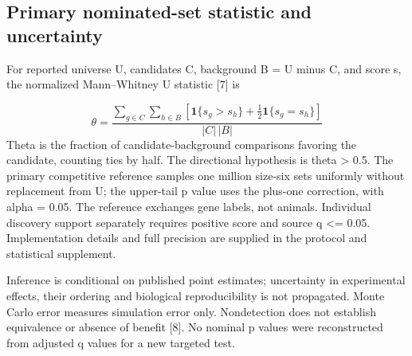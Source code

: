 \documentclass[11pt,letterpaper]{article}
\begin{document}
\subsection*{Primary nominated-set statistic and uncertainty}
For reported universe U, candidates C, background B = U minus C, and score s, the normalized Mann--Whitney U statistic [7] is\par
\[\theta=\frac{\sum_{g\in C}\sum_{h\in B}[\mathbf{1}\{s_g>s_h\}+\frac{1}{2}\mathbf{1}\{s_g=s_h\}]}{|C|\,|B|}\]
Theta is the fraction of candidate-background comparisons favoring the candidate, counting ties by half. The directional hypothesis is theta > 0.5. The primary competitive reference samples one million size-six sets uniformly without replacement from U; the upper-tail p value uses the plus-one correction, with alpha = 0.05. The reference exchanges gene labels, not animals. Individual discovery support separately requires positive score and source q <= 0.05. Implementation details and full precision are supplied in the protocol and statistical supplement.\par
Inference is conditional on published point estimates; uncertainty in experimental effects, their ordering and biological reproducibility is not propagated. Monte Carlo error measures simulation error only. Nondetection does not establish equivalence or absence of benefit [8]. No nominal p values were reconstructed from adjusted q values for a new targeted test.\par
\end{document}
